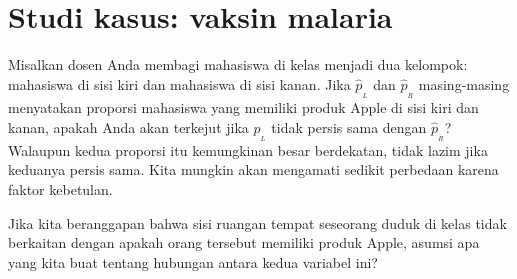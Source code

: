 %
%
%


{}





\section{Studi kasus: vaksin malaria}
\label{caseStudyMalariaVaccine}

\begin{examplewrap}
\begin{nexample}{Misalkan dosen Anda membagi mahasiswa di kelas menjadi dua kelompok: mahasiswa di sisi kiri dan mahasiswa di sisi kanan. Jika $\hat{p}_{_L}$ dan $\hat{p}_{_R}$ masing-masing menyatakan proporsi mahasiswa yang memiliki produk Apple di sisi kiri dan kanan, apakah Anda akan terkejut jika $\hat{p}_{_L}$ tidak {persis} sama dengan $\hat{p}_{_R}$?}\label{classRightLeftSideApple}
Walaupun kedua proporsi itu kemungkinan besar berdekatan, tidak lazim jika keduanya persis sama. Kita mungkin akan mengamati sedikit perbedaan karena {faktor kebetulan}.
\end{nexample}
\end{examplewrap}

\begin{exercisewrap}
\begin{nexercise}
Jika kita beranggapan bahwa sisi ruangan tempat seseorang duduk
di kelas tidak berkaitan dengan apakah orang tersebut memiliki produk Apple,
asumsi apa yang kita buat tentang hubungan antara
kedua variabel ini?\footnotemark{}
\end{nexercise}
\end{exercisewrap}


